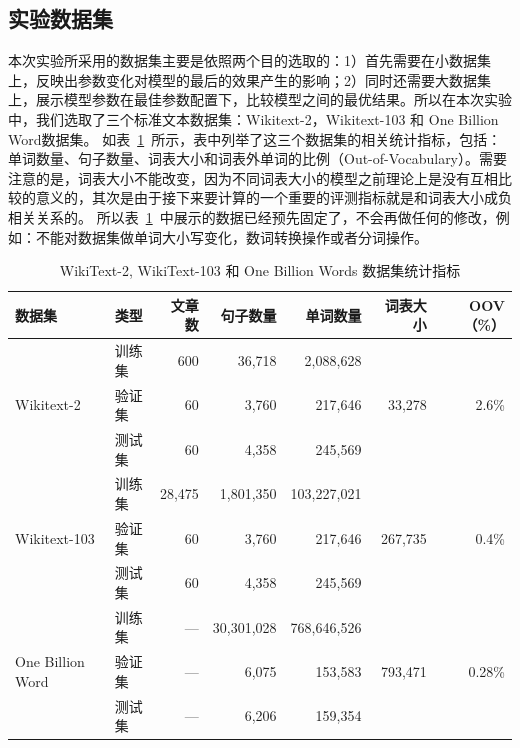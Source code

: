 \subsection{实验数据集}
本次实验所采用的数据集主要是依照两个目的选取的：1）首先需要在小数据集上，反映出参数变化对模型的最后的效果产生的影响；2）同时还需要大数据集上，展示模型参数在最佳参数配置下，比较模型之间的最优结果。所以在本次实验中，我们选取了三个标准文本数据集：Wikitext-2，Wikitext-103 和 One Billion Word数据集。
如表~\ref{tab:dataset}~所示，表中列举了这三个数据集的相关统计指标，包括：单词数量、句子数量、词表大小和词表外单词的比例（Out-of-Vocabulary）。需要注意的是，词表大小不能改变，因为不同词表大小的模型之前理论上是没有互相比较的意义的，其次是由于接下来要计算的一个重要的评测指标就是和词表大小成负相关关系的。
所以表~\ref{tab:dataset}~中展示的数据已经预先固定了，不会再做任何的修改，例如：不能对数据集做单词大小写变化，数词转换操作或者分词操作。
\begin{table}[!ht]
  \centering
  \caption{WikiText-2, WikiText-103 和 One Billion Words 数据集统计指标 \label{tab:dataset}}
\begin{tabular}{llrrrrr}
\toprule
数据集& 类型& 文章数 & 句子数量 &  单词数量 &词表大小 & OOV （\%） \\ \midrule
\multirow{3}{*}{Wikitext-2} &训练集& 600 & 36,718 & 2,088,628 & \multirow{3}{*}{33,278} & \multirow{3}{*}{2.6\%} \\
&验证集& 60 &3,760 & 217,646  & &\\
&测试集& 60 & 4,358 & 245,569 & &\\
\midrule
\multirow{3}{*}{Wikitext-103} &训练集& 28,475 &  1,801,350 &  103,227,021 & \multirow{3}{*}{267,735} & \multirow{3}{*}{0.4\%} \\
&验证集& 60 &3,760 & 217,646  & &\\
&测试集& 60 & 4,358 & 245,569 & &\\
\midrule
\multirow{3}{*}{One Billion Word} &训练集& --- &30,301,028&768,646,526&   \multirow{3}{*}{793,471} &   \multirow{3}{*}{0.28\%} \\
 &验证集& --- &  6,075 &   153,583 &&\\
 &测试集 & --- &  6,206 &   159,354 &&\\
\bottomrule
\end{tabular}
\end{table}

